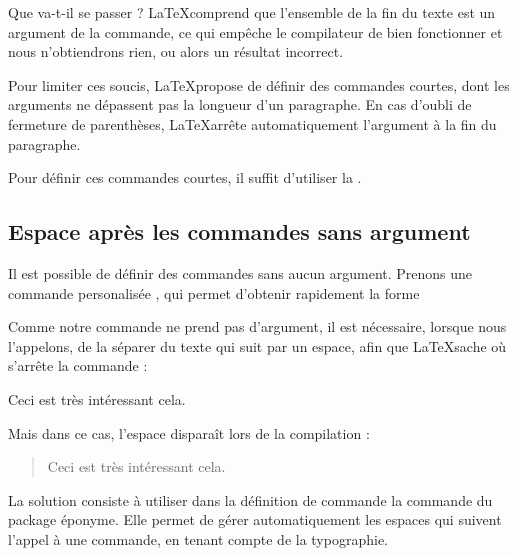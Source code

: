 Que va-t-il se passer ? \LaTeX comprend que l'ensemble de la fin du texte est un argument de la commande, ce qui empêche le compilateur de bien fonctionner  et nous n'obtiendrons rien, ou alors un résultat incorrect.

Pour limiter ces soucis, \LaTeX propose de définir des commandes courtes, dont les arguments ne dépassent pas la longueur d'un paragraphe. En cas d'oubli de fermeture de parenthèses, \LaTeX arrête automatiquement l'argument à la fin du paragraphe.

Pour définir ces commandes courtes, il suffit d'utiliser la .

\begin{latexcode}
\newcommand*{\auteur}[1]{\textsc{#1}*}
\end{latexcode}

\subsection{Espace après les commandes sans argument}


Il est possible de définir des commandes sans aucun argument. Prenons une commande personalisée , qui permet d'obtenir rapidement la forme \forme{\cf}

\begin{latexcode}
\newcommand{\cf}[0]{\emph{cf.}}
\end{latexcode}

Comme notre commande ne prend pas d'argument, il est nécessaire, lorsque nous l'appelons, de la séparer du texte qui suit par un espace, afin que \LaTeX sache où s'arrête la commande : 

\begin{latexcode}
Ceci est très intéressant \cf cela.
\end{latexcode}

Mais dans ce cas, l'espace disparaît lors de la compilation :

\begin{quotation}
Ceci est très intéressant \cf cela.
\end{quotation}

La solution consiste à utiliser dans la définition de commande la commande  du package éponyme. Elle permet de gérer automatiquement les espaces qui suivent l'appel à une commande, en tenant compte de la typographie.

\begin{latexcode}
\newcommand{\cf}[0]{\emph{cf.}\xspace}
\end{latexcode}

